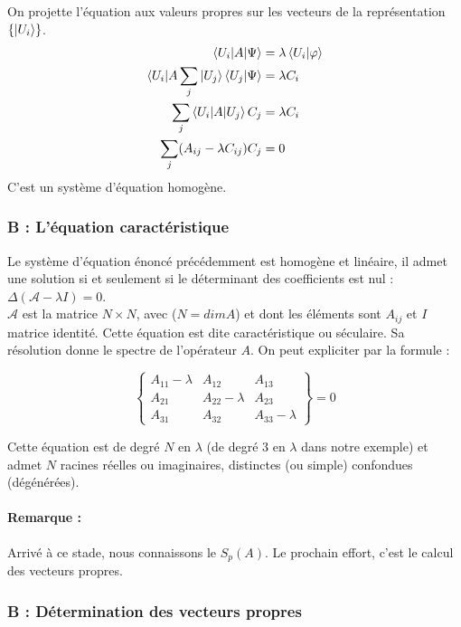 \documentclass[12pt,a4paper,titlepage]{book}
\begin{document}
On projette l'équation aux valeurs propres sur les vecteurs de la représentation $\left\lbrace \ket{U_i} \right\rbrace$.
\begin{align*}
\braket{U_i | A | \Psi} &= \lambda \braket{U_i | \varphi}\\
\braket{U_i | A \sum\limits_j | U_j} \braket{U_j | \Psi} &= \lambda C_i\\
\sum\limits_j \braket{U_i | A | U_j} C_j &= \lambda C_i\\
\sum\limits_j (A_{ij} - \lambda C_{ij}) C_j &= 0
\end{align*}
C'est un système d'équation homogène.

\subsubsection{B : L'équation caractéristique}
Le système d'équation énoncé précédemment est homogène et linéaire, il admet une solution si et seulement si le déterminant des coefficients est nul : $\Delta (\mathcal{A} - \lambda I) = 0$.\\

$\mathcal{A}$ est la matrice $N \times N$, avec ($N = dim A$) et dont les éléments sont $A_{ij}$ et $I$ matrice identité. Cette équation est dite caractéristique ou séculaire. Sa résolution donne le spectre de l'opérateur $A$. On peut expliciter par la formule :
\begin{center}
\[
\left\lbrace
\begin{matrix}
A_{11} - \lambda & A_{12} & A_{13}\\
A_{21} & A_{22} - \lambda & A_{23}\\
A_{31} & A_{32} & A_{33} - \lambda
\end{matrix}
\right\rbrace = 0
\]
\end{center}
Cette équation est de degré $N$ en $\lambda$ (de degré 3 en $\lambda$ dans notre exemple) et admet $N$ racines réelles ou imaginaires, distinctes (ou simple) confondues (dégénérées).

\paragraph*{Remarque :}
Arrivé à ce stade, nous connaissons le $S_p (A)$. Le prochain effort, c'est le calcul des vecteurs propres.

\subsubsection{B : Détermination des vecteurs propres}
\end{document}
